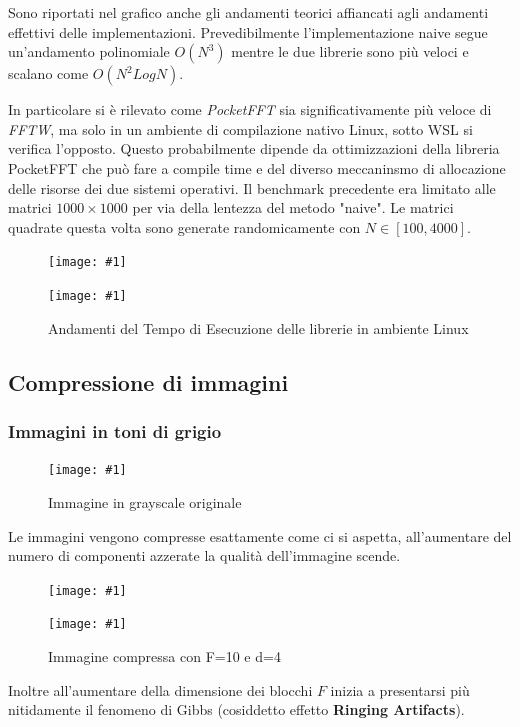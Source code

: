 \documentclass[a4paper,11pt,oneside, table]{article}
\newcommand{\putimage}[4] {
	\begin{figure}[H]
	    \centering
	    \texttt{[image: \#1]}
	    \caption{#2}\label{#3}
	\end{figure}
}
\newcommand{\putsubimage}[5] {
  \begin{minipage}{{#4}\linewidth}
	    \centering
      \texttt{[image: \#1]}
	    \caption{#2}\label{#3}
	\end{minipage}
}
\newcommand{\putimagecouple}[2] {
  \begin{figure}[!htb]
      \centering
      #1
      \hspace{0.5cm}
      #2
  \end{figure}
}
\begin{document}
Sono riportati nel grafico anche gli andamenti teorici affiancati agli andamenti effettivi delle implementazioni.
Prevedibilmente l'implementazione naive segue un'andamento polinomiale $O(N^3)$ mentre le due librerie sono pi\`u veloci e scalano come $O(N^2 Log N)$.

In particolare si \`e rilevato come \textit{PocketFFT} sia significativamente pi\`u veloce di \textit{FFTW}, ma solo in un ambiente di compilazione nativo Linux, sotto WSL si verifica l'opposto.
Questo probabilmente dipende da ottimizzazioni della libreria PocketFFT che pu\`o fare a compile time e del diverso meccaninsmo di allocazione delle risorse dei due sistemi operativi.
Il benchmark precedente era limitato alle matrici $1000 \times 1000$ per via della lentezza del metodo "naive".
Le matrici quadrate questa volta sono generate randomicamente con $N \in [100, 4000]$.

\putimagecouple
  {\putsubimage{./images/benchmark-libraries-wsl.png}{Andamenti del Tempo di Esecuzione delle librerie in ambiente WSL}{png:benchmark-libraries-wsl}{0.45}{0.99}}
  {\putsubimage{./images/benchmark-libraries-linux.png}{Andamenti del Tempo di Esecuzione delle librerie in ambiente Linux}{png:benchmark-libraries-linux}{0.45}{0.99}}

\subsection{Compressione di immagini}

\subsubsection{Immagini in toni di grigio}

\putimage{./images/compression-gs-original.png}{Immagine in grayscale originale}{png:compression-gs-original}{0.45}

Le immagini vengono compresse esattamente come ci si aspetta, all'aumentare del numero di componenti azzerate la qualit\`a dell'immagine scende.

\putimagecouple
  {\putsubimage{./images/compression-gs-F10-d16.png}{Immagine compressa con F=10 e d=16}{png:compression-gs-F10-d16}{0.45}{0.99}}
  {\putsubimage{./images/compression-gs-F10-d4.png}{Immagine compressa con F=10 e d=4}{png:compression-gs-F10-d4}{0.45}{0.99}}

Inoltre all'aumentare della dimensione dei blocchi $F$ inizia a presentarsi pi\`u nitidamente il fenomeno di Gibbs (cosiddetto effetto \textbf{Ringing Artifacts}).
\end{document}
